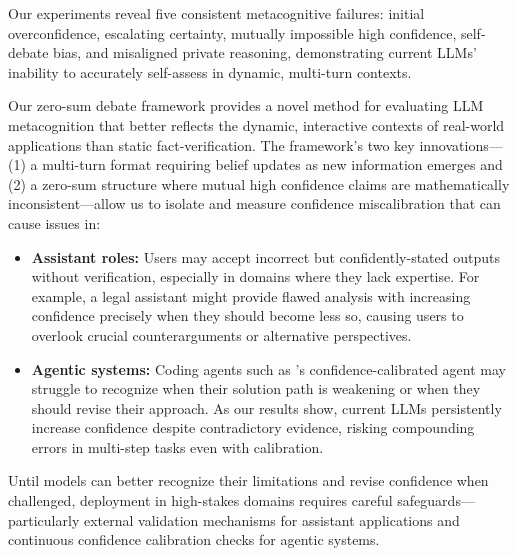 \documentclass{article}
\begin{document}
Our experiments reveal five consistent metacognitive failures: initial overconfidence, escalating certainty, mutually impossible high confidence, self-debate bias, and misaligned private reasoning, demonstrating current LLMs' inability to accurately self-assess in dynamic, multi-turn contexts.

Our zero-sum debate framework provides a novel method for evaluating LLM metacognition that better reflects the dynamic, interactive contexts of real-world applications than static fact-verification. The framework's two key innovations— (1) a multi-turn format requiring belief updates as new information emerges and (2) a zero-sum structure where mutual high confidence claims are mathematically inconsistent—allow us to isolate and measure confidence miscalibration that can cause issues in:
\begin{itemize}
    \item \textbf{Assistant roles:} Users may accept incorrect but confidently-stated outputs without verification, especially in domains where they lack expertise. For example, a legal assistant might provide flawed analysis with increasing confidence precisely when they should become less so, causing users to overlook crucial counterarguments or alternative perspectives.
    \item \textbf{Agentic systems:} Coding agents such as \citet{cognitionlabs_devin21_2025}'s confidence-calibrated agent may struggle to recognize when their solution path is weakening or when they should revise their approach. As our results show, current LLMs persistently increase confidence despite contradictory evidence, risking compounding errors in multi-step tasks even with calibration.
\end{itemize}

Until models can better recognize their limitations and revise confidence when challenged, deployment in high-stakes domains requires careful safeguards—particularly external validation mechanisms for assistant applications and continuous confidence calibration checks for agentic systems.


\end{document}
